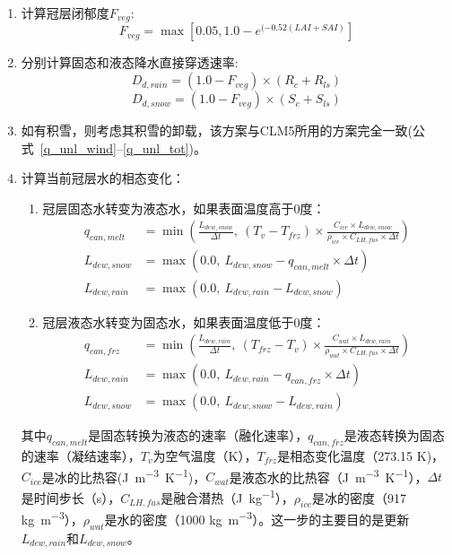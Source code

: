 \begin{enumerate}
\item 计算冠层闭郁度$F_{veg}$:
\begin{equation}
F_{veg} = \max\left[0.05,1.0-e^{(-0.52\left(LAI+SAI\right)}\right]
\end{equation}
\item 分别计算固态和液态降水直接穿透速率:
\begin{equation}
D_{d,rain}=\left(1.0-F_{veg}\right) \times (R_{c}+R_{ls})
\end{equation}
\begin{equation}
D_{d,snow}=\left(1.0-F_{veg}\right) \times (S_{c}+S_{ls})
\end{equation}
\item 如有积雪，则考虑其积雪的卸载，该方案与CLM5所用的方案完全一致(公式~\eqref{q_unl_wind}--\eqref{q_unl_tot})。
\item 计算当前冠层水的相态变化：
\begin{enumerate}
\item 冠层固态水转变为液态水，如果表面温度高于0度：
\begin{equation}
\begin{aligned}
q_{can, melt} &=\min \left(\frac{L_{dew,snow}}{\Delta t},\ \left(T_{v}-T_{frz}\right) \times \frac{C_{ice} \times L_{dew,snow}}{\rho_{i c e} \times C_{LH, fus} \times \Delta t}\right) \\ 
L_{dew,snow} &=\max \left(0.0,\ L_{dew,snow}-q_{c a n, m e l t} \times \Delta t\right) \\
L_{dew,rain} &=\max \left(0.0,\ L_{dew,rain}-L_{dew,snow}\right)
\end{aligned}
\end{equation}
\item 冠层液态水转变为固态水，如果表面温度低于0度：
\begin{equation}
\begin{aligned}
q_{c a n, f r z} &=\min \left(\frac{L_{dew,rain}}{\Delta t},\ \left(T_{f r z}-T_{v}\right) \times \frac{C_{wat} \times L_{dew,rain}}{\rho_{wat} \times C_{LH, fus} \times \Delta t}\right) \\ 
L_{dew,rain} &=\max \left(0.0,\ L_{dew,rain}-q_{can, frz} \times \Delta t\right) \\
L_{dew,snow} &=\max \left(0.0,\ L_{dew,snow}-L_{dew,rain}\right)
\end{aligned}
\end{equation}
\end {enumerate}
其中$q_{can, melt}$是固态转换为液态的速率（融化速率），$q_{can, frz}$是液态转换为固态的速率（凝结速率），$T_{v}$为空气温度（K），$T_{frz}$是相态变化温度（273.15 K)，$C_{ice}$是冰的比热容(\unit{J.m^{-3}.K^{-1}})，$C_{wat}$是液态水的比热容（\unit{J.m^{-3}.K^{-1}}），$\Delta t$是时间步长（s），$C_{LH, fus}$是融合潜热（\unit{J.kg^{-1}}），$\rho_{ice}$是冰的密度（917 \unit{kg.m^{-3}}），$\rho_{wat}$是水的密度（1000 \unit{kg.m^{-3}}）。这一步的主要目的是更新$L_{dew,rain}$和$L_{dew,snow}$。


\end{enumerate}

